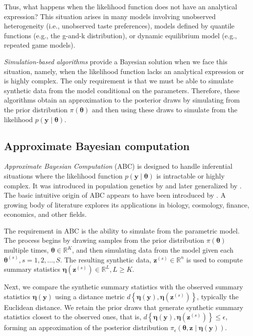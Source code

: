 Thus, what happens when the likelihood function does not have an analytical expression? This situation arises in many models involving unobserved heterogeneity (i.e., unobserved taste preferences), models defined by quantile functions (e.g., the g-and-k distribution), or dynamic equilibrium model (e.g., repeated game models).

\textit{Simulation-based algorithms} provide a Bayesian solution when we face this situation, namely, when the likelihood function lacks an analytical expression or is highly complex. The only requirement is that we must be able to simulate synthetic data from the model conditional on the parameters. Therefore, these algorithms obtain an approximation to the posterior draws by simulating from the prior distribution $\pi(\boldsymbol{\theta})$ and then using these draws to simulate from the likelihood $p(\mathbf{y} \mid \boldsymbol{\theta})$.

\subsection{Approximate Bayesian computation}\label{sec15_12}

\textit{Approximate Bayesian Computation} (ABC) is designed to handle inferential situations where the likelihood function \( p(\boldsymbol{y} \mid \boldsymbol{\theta}) \) is intractable or highly complex. It was introduced in population genetics by \cite{tavare1997inferring, pritchard1999population} and later generalized by \cite{beaumont2002approximate}. The basic intuitive origin of ABC appears to have been introduced by \cite{rubin1984bayesianly}. A growing body of literature explores its applications in biology, cosmology, finance, economics, and other fields.

The requirement in ABC is the ability to simulate from the parametric model. The process begins by drawing samples from the prior distribution \( \pi({\boldsymbol{\theta}}) \) multiple times, $\boldsymbol{\theta}\in\mathbb{R}^K$, and then simulating data from the model given each \( {\boldsymbol{\theta}^{(s)}}, s=1,2,\dots,S \). The resulting synthetic data, \( \boldsymbol{z}^{(s)} \in \mathbb{R}^n \) is used to compute summary statistics \( \boldsymbol{\eta}(\boldsymbol{z}^{(s)}) \in \mathbb{R}^L, L\geq K \).  

Next, we compare the synthetic summary statistics with the observed summary statistics \( \boldsymbol{\eta}(\boldsymbol{y}) \) using a distance metric \( d\left\{ \boldsymbol\eta ({\boldsymbol y}),{\boldsymbol \eta }({\boldsymbol z}^{(s)})\right\} \), typically the Euclidean distance. We retain the prior draws that generate synthetic summary statistics closest to the observed ones, that is, \( d\left\{ \boldsymbol\eta ({\boldsymbol y}),{\boldsymbol \eta }({\boldsymbol z}^{(s)})\right\}\leq \epsilon \), forming an approximation of the posterior distribution \( \pi_{\epsilon}(\boldsymbol{\theta},\boldsymbol{z} \mid \boldsymbol{\eta}(\boldsymbol{y})) \).

